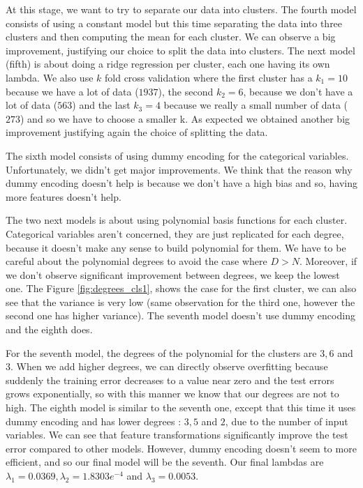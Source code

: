 \documentclass{article} %
\begin{document}
At this stage, we want to try to separate our data into clusters. The fourth model consists of using a constant model but this time separating the data into three clusters and then computing the mean for each cluster. We can observe a big improvement, justifying our choice to split the data into clusters. The next model (fifth) is about doing a ridge regression per cluster, each one having its own lambda. We also use $k$ fold cross validation where the first cluster has a $k_1=10$ because we have a lot of data ($1937$), the second $k_2=6$, because we don't have a lot of data ($563$) and the last $k_3=4$ because we really a small number of data ($273$) and so we have to choose a smaller k. As expected we obtained another big improvement justifying again the choice of splitting the data.

The sixth model consists of using dummy encoding for the categorical variables. Unfortunately, we didn't get major improvements. We think that the reason why dummy encoding doesn't help is because we don't have a high bias and so, having more features doesn't help.

The two next models is about using polynomial basis functions for each cluster. Categorical variables aren't concerned, they are just replicated for each degree, because it doesn't make any sense to build polynomial for them.  We have to be careful about the polynomial degrees to avoid the case where $D > N$. Moreover, if we don't observe significant improvement between degrees, we keep the lowest one. The Figure \ref{fig:degrees_cls1}, shows the case for the first cluster, we can also see that the variance is very low (same observation for the third one, however the second one has higher variance). The seventh model doesn't use dummy encoding and the eighth does.

For the seventh model, the degrees of the polynomial for the clusters are $3,6$ and $3$. When we add higher degrees, we can directly observe overfitting because suddenly the training error decreases to a value near zero and the test errors grows exponentially, so with this manner we know that our degrees are not to high. The eighth model is similar to the seventh one, except that this time it uses dummy encoding and has lower degrees : $3,5$ and $2$, due to the number of input variables. We can see that feature transformations significantly improve the test error compared to other models. However, dummy encoding doesn't seem to more efficient, and so our final model will be the seventh. Our final lambdas are $\lambda_1 = 0.0369, \lambda_2 = 1.8303e^{-4}$ and $\lambda_3 = 0.0053$.
\end{document}
